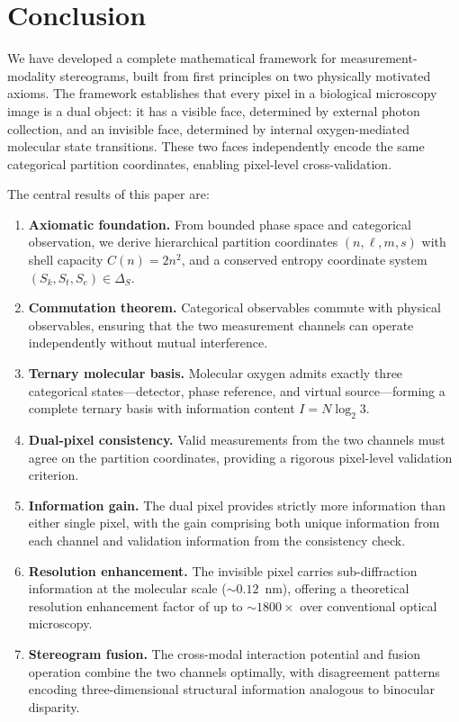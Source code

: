 \documentclass[11pt,twocolumn,a4paper]{article}
\newcommand{\Sk}{S_k}
\newcommand{\St}{S_t}
\newcommand{\Se}{S_e}
\begin{document}
\section{Conclusion}\label{sec:conclusion}

We have developed a complete mathematical framework for measurement-modality stereograms, built from first principles on two physically motivated axioms.
The framework establishes that every pixel in a biological microscopy image is a dual object: it has a visible face, determined by external photon collection, and an invisible face, determined by internal oxygen-mediated molecular state transitions.
These two faces independently encode the same categorical partition coordinates, enabling pixel-level cross-validation.

The central results of this paper are:

\begin{enumerate}
\item \textbf{Axiomatic foundation.} From bounded phase space and categorical observation, we derive hierarchical partition coordinates $(n, \ell, m, s)$ with shell capacity $C(n) = 2n^2$, and a conserved entropy coordinate system $(\Sk, \St, \Se) \in \Delta_S$.

\item \textbf{Commutation theorem.} Categorical observables commute with physical observables, ensuring that the two measurement channels can operate independently without mutual interference.

\item \textbf{Ternary molecular basis.} Molecular oxygen admits exactly three categorical states---detector, phase reference, and virtual source---forming a complete ternary basis with information content $I = N\log_2 3$.

\item \textbf{Dual-pixel consistency.} Valid measurements from the two channels must agree on the partition coordinates, providing a rigorous pixel-level validation criterion.

\item \textbf{Information gain.} The dual pixel provides strictly more information than either single pixel, with the gain comprising both unique information from each channel and validation information from the consistency check.

\item \textbf{Resolution enhancement.} The invisible pixel carries sub-diffraction information at the molecular scale (${\sim}0.12$~nm), offering a theoretical resolution enhancement factor of up to ${\sim}1800\times$ over conventional optical microscopy.

\item \textbf{Stereogram fusion.} The cross-modal interaction potential and fusion operation combine the two channels optimally, with disagreement patterns encoding three-dimensional structural information analogous to binocular disparity.
\end{enumerate}
\end{document}
